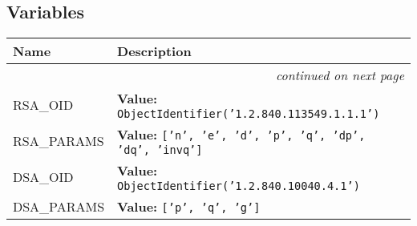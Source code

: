 
  \subsection{Variables}

    \vspace{-1cm}
\hspace{\varindent}\begin{longtable}{|p{\varnamewidth}|p{\vardescrwidth}|l}
\cline{1-2}
\cline{1-2} \centering \textbf{Name} & \centering \textbf{Description}& \\
\cline{1-2}
\endhead\cline{1-2}\multicolumn{3}{r}{\small\textit{continued on next page}}\\\endfoot\cline{1-2}
\endlastfoot\raggedright R\-S\-A\-\_\-O\-I\-D\- & \raggedright \textbf{Value:} 
{\tt ObjectIdentifier('1.2.840.113549.1.1.1')}&\\
\cline{1-2}
\raggedright R\-S\-A\-\_\-P\-A\-R\-A\-M\-S\- & \raggedright \textbf{Value:} 
{\tt \texttt{[}\texttt{'}\texttt{n}\texttt{'}\texttt{, }\texttt{'}\texttt{e}\texttt{'}\texttt{, }\texttt{'}\texttt{d}\texttt{'}\texttt{, }\texttt{'}\texttt{p}\texttt{'}\texttt{, }\texttt{'}\texttt{q}\texttt{'}\texttt{, }\texttt{'}\texttt{dp}\texttt{'}\texttt{, }\texttt{'}\texttt{dq}\texttt{'}\texttt{, }\texttt{'}\texttt{invq}\texttt{'}\texttt{]}}&\\
\cline{1-2}
\raggedright D\-S\-A\-\_\-O\-I\-D\- & \raggedright \textbf{Value:} 
{\tt ObjectIdentifier('1.2.840.10040.4.1')}&\\
\cline{1-2}
\raggedright D\-S\-A\-\_\-P\-A\-R\-A\-M\-S\- & \raggedright \textbf{Value:} 
{\tt \texttt{[}\texttt{'}\texttt{p}\texttt{'}\texttt{, }\texttt{'}\texttt{q}\texttt{'}\texttt{, }\texttt{'}\texttt{g}\texttt{'}\texttt{]}}&\\
\cline{1-2}
\end{longtable}

